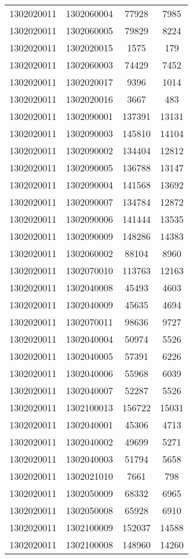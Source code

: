 \begin{longtable}{llcc}
1302020011 & 1302060004 & 77928 & 7985\\
1302020011 & 1302060005 & 79829 & 8224\\
1302020011 & 1302020015 & 1575 & 179\\
1302020011 & 1302060003 & 74429 & 7452\\
1302020011 & 1302020017 & 9396 & 1014\\
1302020011 & 1302020016 & 3667 & 483\\
1302020011 & 1302090001 & 137391 & 13131\\
1302020011 & 1302090003 & 145810 & 14104\\
1302020011 & 1302090002 & 134404 & 12812\\
1302020011 & 1302090005 & 136788 & 13147\\
1302020011 & 1302090004 & 141568 & 13692\\
1302020011 & 1302090007 & 134784 & 12872\\
1302020011 & 1302090006 & 141444 & 13535\\
1302020011 & 1302090009 & 148286 & 14383\\
1302020011 & 1302060002 & 88104 & 8960\\
1302020011 & 1302070010 & 113763 & 12163\\
1302020011 & 1302040008 & 45493 & 4603\\
1302020011 & 1302040009 & 45635 & 4694\\
1302020011 & 1302070011 & 98636 & 9727\\
1302020011 & 1302040004 & 50974 & 5526\\
1302020011 & 1302040005 & 57391 & 6226\\
1302020011 & 1302040006 & 55968 & 6039\\
1302020011 & 1302040007 & 52287 & 5526\\
1302020011 & 1302100013 & 156722 & 15031\\
1302020011 & 1302040001 & 45306 & 4713\\
1302020011 & 1302040002 & 49699 & 5271\\
1302020011 & 1302040003 & 51794 & 5658\\
1302020011 & 1302021010 & 7661 & 798\\
1302020011 & 1302050009 & 68332 & 6965\\
1302020011 & 1302050008 & 65928 & 6910\\
1302020011 & 1302100009 & 152037 & 14588\\
1302020011 & 1302100008 & 148960 & 14260\\

\end{longtable}
